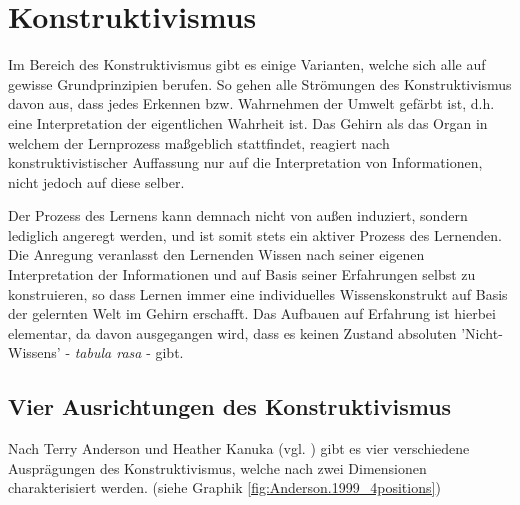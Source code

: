 \chapter{Konstruktivismus}
\label{cha:Konstruktivismus}
Im Bereich des Konstruktivismus gibt es einige Varianten, welche sich alle auf gewisse Grundprinzipien berufen. So gehen alle Strömungen des Konstruktivismus davon aus, dass jedes Erkennen bzw. Wahrnehmen der Umwelt gefärbt ist, d.h. eine Interpretation der eigentlichen Wahrheit ist. Das Gehirn als das Organ in welchem der Lernprozess maßgeblich stattfindet, reagiert nach konstruktivistischer Auffassung nur auf die Interpretation von Informationen, nicht jedoch auf diese selber. \cite{Reinmann.2013} %

Der Prozess des Lernens kann demnach nicht von außen induziert, sondern lediglich angeregt werden, und ist somit stets ein aktiver Prozess des Lernenden.  \cite{Reinmann.2013} %
Die Anregung veranlasst den Lernenden Wissen nach seiner eigenen Interpretation der Informationen und auf Basis seiner Erfahrungen selbst zu konstruieren, so dass Lernen immer eine individuelles Wissenskonstrukt auf Basis der gelernten Welt im Gehirn erschafft. \cite{Edelmann.2012} Das Aufbauen auf Erfahrung ist hierbei elementar, da davon ausgegangen wird, dass es keinen Zustand absoluten 'Nicht-Wissens' - \emph{tabula rasa} - gibt. \cite{Anderson.1999} %

\section{Vier Ausrichtungen des Konstruktivismus}
\label{sec:Konstr_4positions}

Nach Terry Anderson und Heather Kanuka (vgl. \cite{Anderson.1999}) gibt es vier verschiedene Ausprägungen des Konstruktivismus, welche nach zwei Dimensionen charakterisiert werden. (siehe Graphik \ref{fig:Anderson.1999_4positions})

